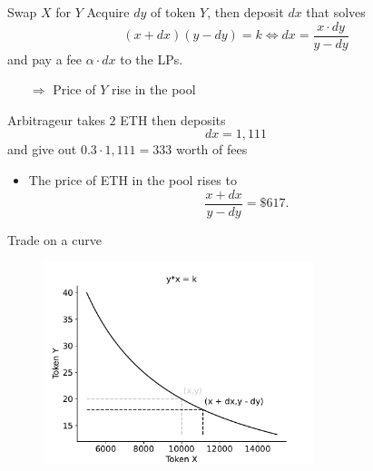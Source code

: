 \documentclass{beamer}
\begin{document}
\begin{frame}{Swap $X$ for $Y$}
\footnotesize
Acquire $dy$ of token $Y$, then deposit $dx$ that solves
$$
(x+dx)(y-dy) = k\Leftrightarrow dx = \frac{x\cdot dy}{y-dy}
$$
and pay a fee $\alpha \cdot dx$ to the LPs.
\begin{itemize}
  \item[$\Rightarrow$] Price of $Y$ rise in the pool
\end{itemize}
\begin{tcolorbox}[enhanced,drop shadow, title=Example]
    \footnotesize
    Arbitrageur takes $2$ ETH then deposits
    $$
    dx = 1,111 
    $$
    and give out $0.3\cdot 1,111 = 333$ worth of fees
    \begin{itemize}
      \item The price of ETH in the pool rises to 
      $$
      \frac{x+dx}{y-dy} = \$ 617.
      $$
    \end{itemize}
\end{tcolorbox}
\end{frame}
\begin{frame}{Trade on a curve}
\begin{figure}[!ht]
    \includegraphics[width = 0.7\textwidth]{../../Figures/AMM_after_swap.pdf}
    \centering
    \label{fig:AMM_after_swap}
\end{figure}
\end{frame}
\end{document}
